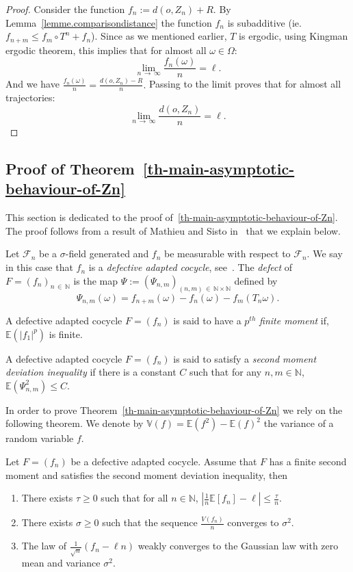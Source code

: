 \documentclass[AHL,Unicode,longabstracts,published]{cedram}
\newcommand{\bE}{\mathbb{E}}
\newcommand{\bV}{\mathbb{V}}
\newcommand{\cF}{\mathcal{F}}
\newcommand{\N}{\mathbb{N}}
\newcommand{\EE}{\mathbb{E}}
\newcommand{\NN}{\mathbb{N}}
\newcommand{\tv}{\rightarrow}
\begin{document}
\begin{proof}
Consider the function $f_n := d(o, Z_n) +R$. By Lemma~\ref{lemme.comparisondistance} the function $f_n$ is subadditive (ie. $ f_{n+m} \leq f_m \circ T^n + f_n$). Since as we mentioned earlier, $T$ is ergodic, using Kingman ergodic theorem, this implies that for almost all $\omega \in \Omega:$
\[
\lim_{n\,\tv\,\infty} \frac{f_n(\omega)}{n}= \ell.
\]
And we have $\frac{f_n(\omega)}{n} = \frac{d(o,Z_n) -R} {n}.$ Passing to the limit proves that for almost all trajectories:
\[
\lim_{n\,\tv\,\infty} \frac{d(o,Z_n)}{n} = \ell .
\]
\end{proof}



\subsection{Proof of Theorem~\ref{th-main-asymptotic-behaviour-of-Zn}}
This section is dedicated to the proof of~\ref{th-main-asymptotic-behaviour-of-Zn}. The proof follows from a result of Mathieu and Sisto in~\cite{artmathieusisto} that we explain below. 

Let $\cF_n$ be a $\sigma$-field generated and $f_n$ be measurable with respect to $\cF_n$. We say in this case that $f_n$ is a \emph{defective adapted cocycle}, see~\cite[Definition~3.1]{artmathieusisto}. The \emph{defect} of $F=(f_n)_{n\,\in\,\N}$ is the map $\Psi:=(\Psi_{n,m})_{(n,m)\,\in\,\N\times \N}$ defined by
\begin{equation}
\Psi_{n,m}(\omega) = f_{n+m}(\omega) - f_n(\omega) - f_m\left(T_n \omega\right) .
\end{equation}

A defective adapted cocycle $F=(f_n)$ is said to have a $p^{th}$ \emph{finite moment} if, $\bE(|f_1|^p)$ is finite. 

A defective adapted cocycle $F=(f_n)$ is said to satisfy a \emph{second moment deviation inequality} if there is a constant $C$ such that for any $n,m \in \NN$, $ \EE(\Psi_{n,m}^2) \le C $.

In order to prove Theorem~\ref{th-main-asymptotic-behaviour-of-Zn} we rely on the following theorem. We denote by $\bV(f)=\bE(f^2)-\bE(f)^2$ the variance of a random variable $f$.

\begin{theo}\cite[{Lemma~3.4, Theorem~4.1, Theorem~4.2}]{artmathieusisto}\label{theo_mathieusisto}
Let $F=(f_n)$ be a defective adapted cocycle. Assume that $F$ has a finite second moment and satisfies the second moment deviation inequality, then
\begin{enumerate}
\item\label{theo5.5.1} There exists $\tau\geq 0$ such that for all $n\in \N$, $| \tfrac{1}{n} \bE[f_n] -\ell| \leq \frac{\tau}{n}$.
\item\label{theo5.5.2} There exists $\sigma\geq 0$ such that the sequence $\tfrac{V(f_n)}{n}$ converges to $\sigma^2$.
\item\label{theo5.5.3} The law of $\tfrac{1}{\sqrt{n}} (f_n - \ell n) $ weakly converges to the Gaussian law with zero mean and variance $\sigma^2$.
\end{enumerate}
\end{theo}
\end{document}

